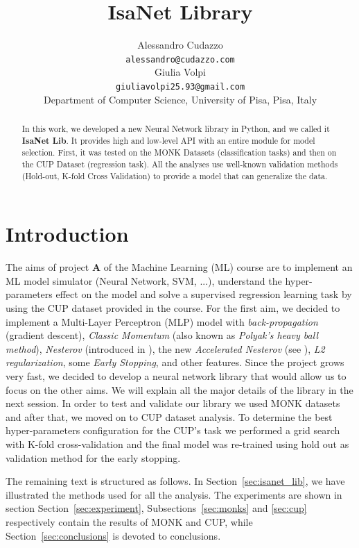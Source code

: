 \documentclass[11pt]{article}
\title{IsaNet Library}
\author{
  Alessandro Cudazzo \\
  \texttt{alessandro@cudazzo.com} \\
   \And
  Giulia Volpi \\
  \texttt{giuliavolpi25.93@gmail.com} \\
  \AND
  Department of Computer Science, University of Pisa, Pisa, Italy
}
\begin{document}
\maketitle
\begin{abstract}
In this work, we developed a new Neural Network library in Python, and we called it \textbf{IsaNet Lib}. It provides high and low-level API with an entire module for model selection. First, it was tested on the MONK Datasets (classification tasks) and then on the CUP Dataset (regression task). All the analyses use well-known validation methods (Hold-out, K-fold Cross Validation) to provide a model that can generalize the data.
\end{abstract}

\section{Introduction}
The aims of project \textbf{A} of the Machine Learning (ML) course are to implement an ML model simulator (Neural Network, SVM, ...), understand the hyper-parameters effect on the model and solve a supervised regression learning task by using the CUP dataset provided in the course. For the first aim, we decided to implement a Multi-Layer Perceptron (MLP) model with \textit{back-propagation} (gradient descent), \textit{Classic Momentum} (also known as \textit{Polyak’s heavy ball method}\cite{Polyak1964}), \textit{Nesterov} (introduced in \cite{sutskever2013}), the new \textit{Accelerated Nesterov} (see \cite{nakerst2020gradient}), \textit{L2 regularization}, some \textit{Early Stopping}, and other features. Since the project grows very fast, we decided to develop a neural network library that would allow us to focus on the other aims.  We will explain all the major details of the library in the next session. In order to test and validate our library we used MONK datasets~\cite{Dua:2019} and after that, we moved on to CUP dataset analysis. To determine the best hyper-parameters configuration for the CUP's task we performed a grid search with K-fold cross-validation and the final model was re-trained using hold out as validation method for the early stopping.

The remaining text is structured as follows. In Section~\ref{sec:isanet_lib}, we have illustrated the methods used for all the analysis. The experiments are shown in section Section~\ref{sec:experiment}, Subsections~\ref{sec:monks} and \ref{sec:cup} respectively contain the results of MONK and CUP, while Section~\ref{sec:conclusions} is devoted to conclusions.
\end{document}
